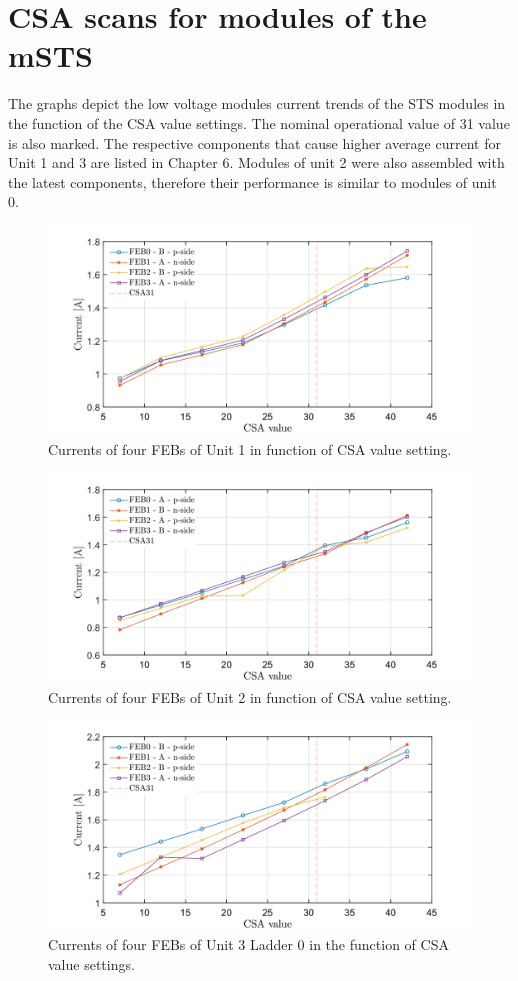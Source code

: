 \chapter{CSA scans for modules of the mSTS}
\label{CSA}
The graphs depict the low voltage modules current trends of the \gls{STS} modules in the function of the CSA value settings. The nominal operational value of 31 value is also marked. The respective components that cause higher average current for Unit 1 and 3 are listed in Chapter 6. Modules of unit 2 were also assembled with the latest components, therefore their performance is similar to modules of unit 0.
\vfill
\begin{figure}[h!]
\centering
\includegraphics[width=0.9\columnwidth]{Chapter6/DCS/images/U1CSABIAS.png}
\caption{Currents of four \glspl{FEB} of Unit 1 in function of CSA value setting.}
\label{U1CSABIAS}
\end{figure}
\vfill
\begin{figure}
\centering
\includegraphics[width=0.9\columnwidth]{Chapter6/DCS/images/U2CSABIAS.png}
\caption{Currents of four \glspl{FEB} of Unit 2 in function of CSA value setting.}
\label{U2CSABIAS}
\end{figure}

\begin{figure}[h!]
\centering
\includegraphics[width=0.9\columnwidth]{Chapter6/DCS/images/U3L1CSABIAS.png}
\caption{Currents of four \glspl{FEB} of Unit 3 Ladder 0 in the function of CSA value settings.}
\label{U3L1CSABIAS}
\end{figure}

